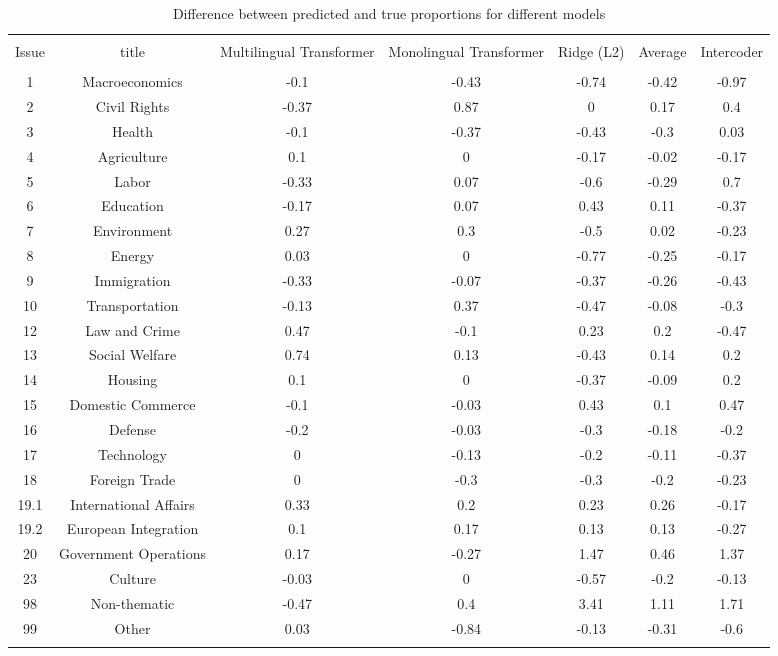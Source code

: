
\begin{table}[!htbp] \centering 
  \caption{Difference between predicted and true proportions for different models} 
  \label{tab:aggregated-eval} 
\begin{tabular}{@{\extracolsep{5pt}} ccccccc} 
\\[-1.8ex]\hline 
\hline \\[-1.8ex] 
Issue & title & Multilingual Transformer & Monolingual Transformer & Ridge (L2) & Average & Intercoder \\ 
\hline \\[-1.8ex] 
1 & Macroeconomics & -0.1 & -0.43 & -0.74 & -0.42 & -0.97 \\ 
2 & Civil Rights & -0.37 & 0.87 & 0 & 0.17 & 0.4 \\ 
3 & Health & -0.1 & -0.37 & -0.43 & -0.3 & 0.03 \\ 
4 & Agriculture & 0.1 & 0 & -0.17 & -0.02 & -0.17 \\ 
5 & Labor & -0.33 & 0.07 & -0.6 & -0.29 & 0.7 \\ 
6 & Education & -0.17 & 0.07 & 0.43 & 0.11 & -0.37 \\ 
7 & Environment & 0.27 & 0.3 & -0.5 & 0.02 & -0.23 \\ 
8 & Energy & 0.03 & 0 & -0.77 & -0.25 & -0.17 \\ 
9 & Immigration & -0.33 & -0.07 & -0.37 & -0.26 & -0.43 \\ 
10 & Transportation & -0.13 & 0.37 & -0.47 & -0.08 & -0.3 \\ 
12 & Law and Crime & 0.47 & -0.1 & 0.23 & 0.2 & -0.47 \\ 
13 & Social Welfare & 0.74 & 0.13 & -0.43 & 0.14 & 0.2 \\ 
14 & Housing & 0.1 & 0 & -0.37 & -0.09 & 0.2 \\ 
15 & Domestic Commerce & -0.1 & -0.03 & 0.43 & 0.1 & 0.47 \\ 
16 & Defense & -0.2 & -0.03 & -0.3 & -0.18 & -0.2 \\ 
17 & Technology & 0 & -0.13 & -0.2 & -0.11 & -0.37 \\ 
18 & Foreign Trade & 0 & -0.3 & -0.3 & -0.2 & -0.23 \\ 
19.1 & International Affairs & 0.33 & 0.2 & 0.23 & 0.26 & -0.17 \\ 
19.2 & European Integration & 0.1 & 0.17 & 0.13 & 0.13 & -0.27 \\ 
20 & Government Operations & 0.17 & -0.27 & 1.47 & 0.46 & 1.37 \\ 
23 & Culture & -0.03 & 0 & -0.57 & -0.2 & -0.13 \\ 
98 & Non-thematic & -0.47 & 0.4 & 3.41 & 1.11 & 1.71 \\ 
99 & Other & 0.03 & -0.84 & -0.13 & -0.31 & -0.6 \\ 
\hline \\[-1.8ex] 
\end{tabular} 
\end{table} 
